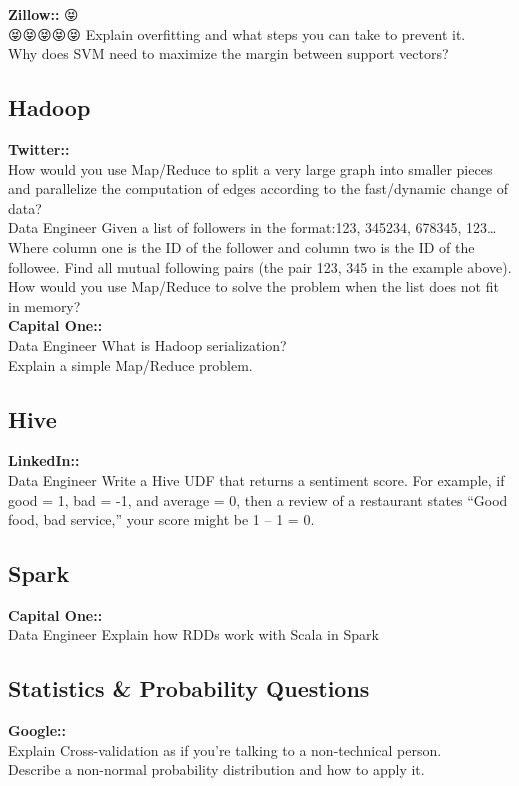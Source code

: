 \documentclass[11pt]{article}
\begin{document}
{\bf Zillow:: }😝 \\ 😝😝😝😝😝
Explain overfitting and what steps you can take to prevent it.\\
Why does SVM need to maximize the margin between support vectors?\\


\subsection{Hadoop}
{\bf Twitter:: }\\
How would you use Map/Reduce to split a very large graph into smaller pieces and parallelize the computation of edges according to the fast/dynamic change of data?\\
Data Engineer Given a list of followers in the format:123, 345234, 678345, 123…Where column one is the ID of the follower and column two is the ID of the followee. Find all mutual following pairs (the pair 123, 345 in the example above). How would you use Map/Reduce to solve the problem when the list does not fit in memory?\\

{\bf Capital One:: }\\
Data Engineer What is Hadoop serialization?\\
Explain a simple Map/Reduce problem.\\


\subsection{Hive}
{\bf LinkedIn:: }\\
Data Engineer Write a Hive UDF that returns a sentiment score. For example, if good = 1, bad = -1, and average = 0, then a review of a restaurant states “Good food, bad service,” your score might be 1 – 1 = 0. \\


\subsection{Spark}
{\bf Capital One:: }\\
Data Engineer Explain how RDDs work with Scala in Spark \\


\subsection{Statistics \& Probability Questions}
{\bf Google:: }\\
Explain Cross-validation as if you’re talking to a non-technical person.\\
Describe a non-normal probability distribution and how to apply it.\\
\end{document}
